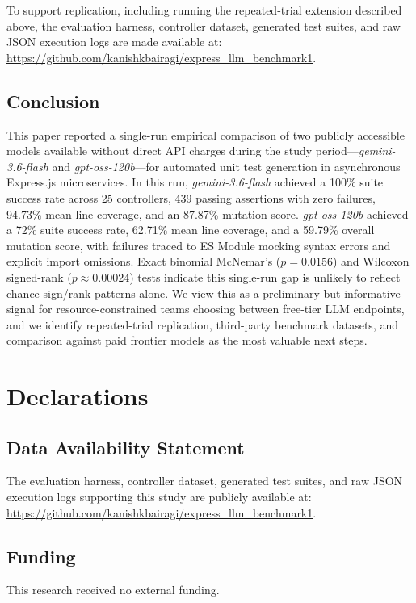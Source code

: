 \documentclass[conference]{IEEEtran}
\begin{document}
To support replication, including running the repeated-trial extension described above, the evaluation harness, controller dataset, generated test suites, and raw JSON execution logs are made available at: \url{https://github.com/kanishkbairagi/express_llm_benchmark1}.

\subsection{Conclusion}

This paper reported a single-run empirical comparison of two publicly accessible models available without direct API charges during the study period---\textit{gemini-3.6-flash} and \textit{gpt-oss-120b}---for automated unit test generation in asynchronous Express.js microservices. In this run, \textit{gemini-3.6-flash} achieved a 100\% suite success rate across 25 controllers, 439 passing assertions with zero failures, 94.73\% mean line coverage, and an 87.87\% mutation score. \textit{gpt-oss-120b} achieved a 72\% suite success rate, 62.71\% mean line coverage, and a 59.79\% overall mutation score, with failures traced to ES Module mocking syntax errors and explicit import omissions. Exact binomial McNemar's ($p = 0.0156$) and Wilcoxon signed-rank ($p \approx 0.00024$) tests indicate this single-run gap is unlikely to reflect chance sign/rank patterns alone. We view this as a preliminary but informative signal for resource-constrained teams choosing between free-tier LLM endpoints, and we identify repeated-trial replication, third-party benchmark datasets, and comparison against paid frontier models as the most valuable next steps.

\section*{Declarations}

\subsection*{Data Availability Statement}
The evaluation harness, controller dataset, generated test suites, and raw JSON execution logs supporting this study are publicly available at: \url{https://github.com/kanishkbairagi/express_llm_benchmark1}.

\subsection*{Funding}
This research received no external funding.
\end{document}
